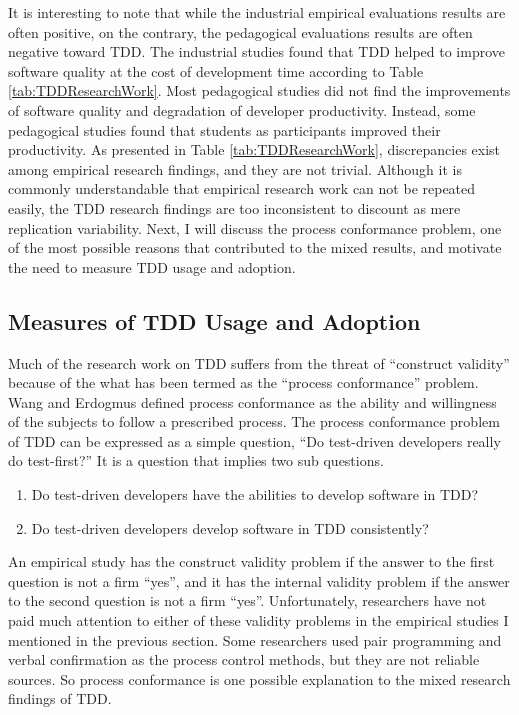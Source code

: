 It is interesting to note that while the industrial empirical evaluations results are often positive, on the contrary, the pedagogical evaluations results are often negative toward TDD. The industrial studies found that TDD helped to improve software quality at the cost of development time according to Table \ref{tab:TDDResearchWork}. Most pedagogical studies did not find the improvements of software quality and degradation of developer productivity. Instead, some pedagogical studies found that students as participants improved their productivity. As presented in Table \ref{tab:TDDResearchWork}, discrepancies exist among empirical research findings, and they are not trivial. Although it is commonly understandable that empirical research work can not be repeated easily, the TDD research findings are too inconsistent to discount as mere replication variability. Next, I will discuss the process conformance problem, one of the most possible reasons that contributed to the mixed results, and motivate the need to measure TDD usage and adoption. 

\subsection{Measures of TDD Usage and Adoption}
Much of the research work on TDD suffers from the threat of ``construct validity'' \cite{Wang:04} because of the what has been termed as the ``process conformance'' problem. Wang and Erdogmus defined process conformance as the ability and willingness of the subjects to follow a prescribed process. The process conformance problem of TDD can be expressed as a simple question, ``Do test-driven developers really do test-first?''  It is a question that implies two sub questions.
\begin{enumerate}
\item Do test-driven developers have the abilities to develop software in TDD?
\item Do test-driven developers develop software in TDD consistently?
\end{enumerate} 
An empirical study has the construct validity problem if the answer to the first question is not a firm ``yes'', and it has the internal validity problem if the answer to the second question is not a firm ``yes''. Unfortunately, researchers have not paid much attention to either of these validity problems in the empirical studies I mentioned in the previous section. Some researchers used pair programming \cite{George:03} and verbal confirmation \cite{Muller:02} as the process control methods, but they are not reliable sources. So process conformance is one possible explanation to the mixed research findings of TDD.

